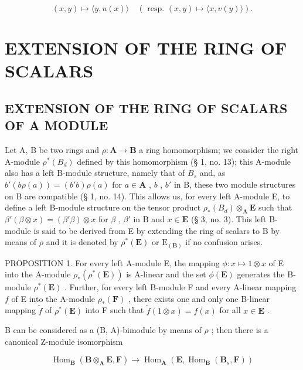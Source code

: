 \[
(x, y) \mapsto \langle y, u (x) \rangle \quad (\text { resp. } (x, y) \mapsto \langle x, v (y) \rangle).
\]

\section{EXTENSION OF THE RING OF SCALARS}

\subsection{EXTENSION OF THE RING OF SCALARS OF A MODULE}

Let A, B be two rings and \(\rho: \mathbf{A} \to \mathbf{B}\) a ring homomorphism; we consider the right A-module \(\rho^{*}(B_{d})\) defined by this homomorphism (§ 1, no. 13); this A-module also has a left B-module structure, namely that of \(B_{s}\) and, as \(b'(b\rho(a)) = (b'b)\rho(a)\) for \(a \in \mathbf{A}\) , \(b\) , \(b'\) in B, these two module structures on B are compatible (§ 1, no. 14). This allows us, for every left A-module E, to define a left B-module structure on the tensor product \(\rho_{*}(B_{d}) \otimes_{\mathbf{A}} \mathbf{E}\) such that \(\beta'(\beta \otimes x) = (\beta'\beta) \otimes x\) for \(\beta\) , \(\beta'\) in B and \(x \in \mathbf{E}\) (§ 3, no. 3). This left B-module is said to be derived from E by extending the ring of scalars to B by means of \(\rho\) and it is denoted by \(\rho^{*}(\mathbf{E})\) or \(\mathrm{E}_{(\mathbf{B})}\) if no confusion arises.

PROPOSITION 1. For every left A-module E, the mapping \(\phi: x \mapsto 1 \otimes x\) of E into the A-module \(\rho_*(\rho^*(\mathbf{E}))\) is A-linear and the set \(\phi(\mathbf{E})\) generates the B-module \(\rho^*(\mathbf{E})\) . Further, for every left B-module F and every A-linear mapping \(f\) of E into the A-module \(\rho_*(\mathbf{F})\) , there exists one and only one B-linear mapping \(\tilde{f}\) of \(\rho^*(\mathbf{E})\) into F such that \(\tilde{f}(1 \otimes x) = f(x)\) for all \(x \in \mathbf{E}\) .

B can be considered as a (B, A)-bimodule by means of \(\rho\) ; then there is a canonical Z-module isomorphism

\[
\operatorname{Hom} _ {\mathbf {B}} (\mathbf {B} \otimes_ {\mathbf {A}} \mathbf {E}, \mathbf {F}) \rightarrow \operatorname{Hom} _ {\mathbf {A}} (\mathbf {E}, \operatorname{Hom} _ {\mathbf {B}} (\mathbf {B} _ {s}, \mathbf {F}))\tag{1}
\]

